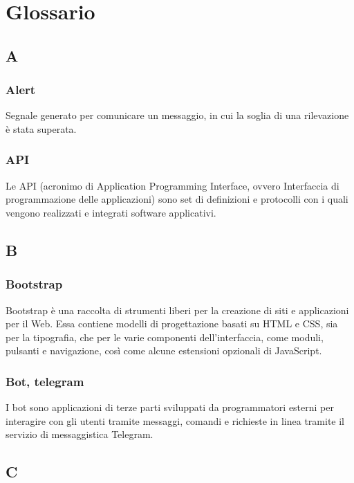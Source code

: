

\appendix
{}

\setcounter{secnumdepth}{1} %
\setcounter{tocdepth}{3} %


\section{Glossario}
\subsection{A}
\subsubsection{Alert} Segnale generato per comunicare un messaggio, in cui la soglia di una rilevazione è stata superata.
\subsubsection{API} Le API (acronimo di Application Programming Interface, ovvero Interfaccia di programmazione delle applicazioni) sono set di definizioni e protocolli con i quali vengono realizzati e integrati software applicativi.
\subsection{B}
\subsubsection{Bootstrap}  Bootstrap è una raccolta di strumenti liberi per la creazione di siti e applicazioni per il Web. Essa contiene modelli di progettazione basati su HTML e CSS, sia per la tipografia, che per le varie componenti dell'interfaccia, come moduli, pulsanti e navigazione, così come alcune estensioni opzionali di JavaScript.
\subsubsection{Bot, telegram}  I bot sono applicazioni di terze parti sviluppati da programmatori esterni per interagire con gli utenti tramite messaggi, comandi e richieste in linea tramite il servizio di messaggistica Telegram.
\subsection{C}

